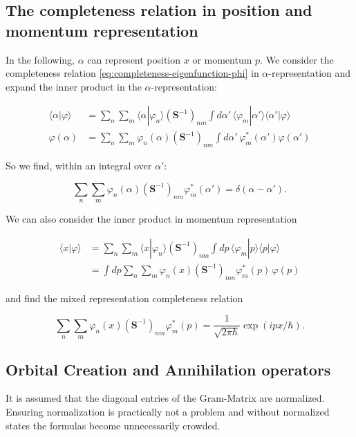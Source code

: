 \subsection*{The completeness relation in position and momentum representation}

In the following, $\alpha$ can represent position $x$ or momentum $p$.
We consider the completeness relation \eqref{eq:completeness-eigenfunction-phi} in
$\alpha$-representation and expand the inner product in the
$\alpha$-representation:

\begin{align}
\langle\alpha|\varphi\rangle &= \sum_n\sum_m \langle\alpha|\varphi_n\rangle\left(\mathbf S^{-1}\right)_{nm}\int d\alpha'\,\langle\varphi_m|\alpha'\rangle\langle\alpha'|\varphi\rangle\\
\varphi(\alpha) &= \sum_n\sum_m \varphi_n(\alpha)\left(\mathbf S^{-1}\right)_{nm}\int d\alpha'\,\varphi_m^*(\alpha')\varphi(\alpha')
\end{align}

So we find, within an integral over $\alpha'$:

\begin{equation}
\sum_n\sum_m \varphi_n(\alpha)\left(\mathbf S^{-1}\right)_{nm}\varphi_m^*(\alpha') = \delta(\alpha-\alpha').
\end{equation}

We can also consider the inner product in momentum representation

\begin{align}
\langle x|\varphi\rangle &= \sum_n\sum_m \langle x|\varphi_n\rangle\left(\mathbf S^{-1}\right)_{nm}\int dp\,\langle\varphi_m|p\rangle\langle p|\varphi\rangle\\
&= \int dp \sum_n\sum_m \varphi_n(x)\left(\mathbf S^{-1}\right)_{nm}\varphi_m^*(p)\,\varphi(p)
\end{align}

and find the mixed representation completeness relation

\begin{equation}
\sum_n\sum_m \varphi_n(x)\left(\mathbf S^{-1}\right)_{nm}\varphi_m^*(p) = \frac{1}{\sqrt{2\pi\hbar}}\exp(ipx/\hbar).
\end{equation}

\subsection{Orbital Creation and Annihilation operators}
It is assumed that the diagonal entries of the Gram-Matrix are normalized. Ensuring normalization is practically not a problem
and without normalized states the formulas become unnecessarily crowded.

